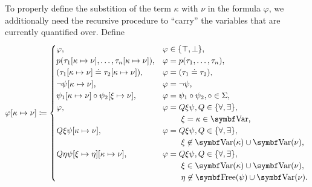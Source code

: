 \begin{definition}
\begin{DefEnum}
     To properly define the substition of the term \( \kappa \) with \( \nu \) in the formula \( \varphi \), we additionally need the recursive procedure to \enquote{carry} the variables that are currently quantified over. Define
    \begin{equation}\label{eq:def:first_order_substition/term_in_formula}
      \varphi[\kappa \mapsto \nu] \coloneqq \begin{cases}
        \varphi,                                                           &\varphi \in \{ \top, \bot \}, \\
        p(\tau_1[\kappa \mapsto \nu], \ldots, \tau_n[\kappa \mapsto \nu]), &\varphi = p(\tau_1, \ldots, \tau_n), \\
        (\tau_1[\kappa \mapsto \nu] \doteq \tau_2[\kappa \mapsto \nu]),    &\varphi = (\tau_1 \doteq \tau_2), \\
        \neg \psi[\kappa \mapsto \nu],                                     &\varphi = \neg \psi, \\
        \psi_1[\kappa \mapsto \nu] \circ \psi_2[\xi \mapsto \nu],          &\varphi = \psi_1 \circ \psi_2, \circ \in \Sigma, \\
        \varphi,                                                           &\varphi = Q \xi \psi, Q \in \{ \forall, \exists \}, \\
                                                                           &\hspace{0.8cm} \xi = \kappa \in \Bold{Var}, \\
        Q \xi \psi[\kappa \mapsto \nu],                                    &\varphi = Q \xi \psi, Q \in \{ \forall, \exists \}, \\
                                                                           &\hspace{0.8cm} \xi \not\in \Bold{Var}(\kappa) \cup \Bold{Var}(\nu), \\
        Q \eta \psi[\xi \mapsto \eta][\kappa \mapsto \nu],                 &\varphi = Q \xi \psi, Q \in \{ \forall, \exists \}, \\
                                                                           &\hspace{0.8cm} \xi \in \Bold{Var}(\kappa) \cup \Bold{Var}(\nu), \\
                                                                           &\hspace{0.8cm} \eta \not\in \Bold{Free}(\psi) \cup \Bold{Var}(\nu).
      \end{cases}
    \end{equation}
  \end{DefEnum}
\end{definition}

